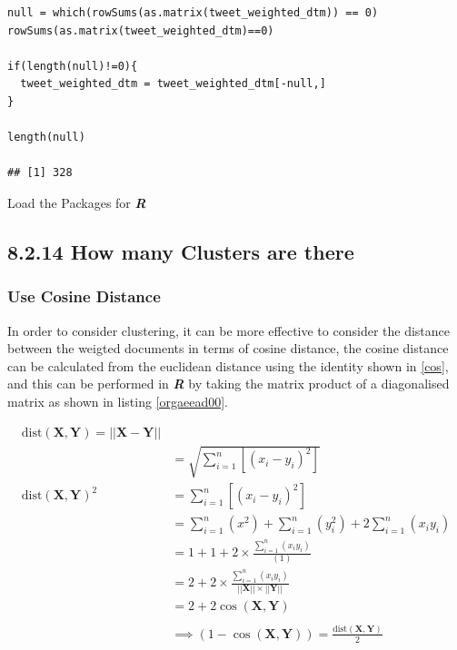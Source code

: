 \documentclass[11pt]{article}
\begin{document}
\begin{listing}[htbp]
\begin{verbatim}
null = which(rowSums(as.matrix(tweet_weighted_dtm)) == 0)
rowSums(as.matrix(tweet_weighted_dtm)==0)

if(length(null)!=0){
  tweet_weighted_dtm = tweet_weighted_dtm[-null,]
}

length(null)

## [1] 328
\end{verbatim}
\caption{\label{orgc3f0df7}Load the Packages for \textbf{\textbf{\emph{R}}}}
\end{listing}
\subsection{8.2.14 How many Clusters are there}
\label{sec:org323466c}
\subsubsection{Use Cosine Distance}
\label{sec:org66ed0b2}
In order to consider clustering, it can be more effective to consider the distance between the weigted documents in terms of cosine distance, the cosine distance can be calculated from the euclidean distance using the identity shown in \eqref{cos}, and this can be performed in \textbf{\emph{R}} by taking the matrix product of a diagonalised matrix as shown in listing \ref{orgaeead00}.

\begin{align}
\mathrm{dist}\left( \mathbf{X}, \mathbf{Y} \right)= \left| \left| \mathbf{X}-\mathbf{Y} \right| \right| \\
&= \sqrt{\sum^{n}_{i= 1}   \left[ \left( x_i-y_i \right)^2 \right] } \\
\mathrm{dist}\left( \mathbf{X}, \mathbf{Y} \right)^2&= \sum^{n}_{i= 1}  \left[ \left( x_i-y_i \right)^2 \right] \\
&= \sum^{n}_{i= 1}   \left( x^2 \right)+  \sum^{n}_{i= 1}   \left( y_i^2 \right)+ 2 \sum^{n}_{i= 1}   \left( x_iy_i \right) \\
&= 1+ 1 +  2 \times  \frac{\sum^{n}_{i= 1}   \left( x_iy_i \right)}{\left( 1 \right) }\\
&= 2+ 2\times \frac{\sum^{n}_{i= 1}   \left( x_iy_i \right)}{\left| \left| \mathbf{X} \right| \right|\times \left| \left| \mathbf{Y} \right| \right|}\\
&= 2+ 2 \cos\left( \mathbf{X}, \mathbf{Y} \right)\\
\ \\
& \implies  \left( 1- \cos\left( \mathbf{X}, \mathbf{Y} \right) \right) = \frac{\mathrm{dist}\left( \mathbf{X}, \mathbf{Y} \right)}{2} \label{cos}
\end{align}
\end{document}
